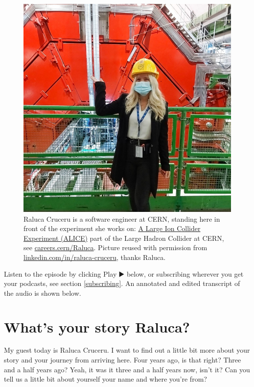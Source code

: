 \documentclass[
]{book}
\begin{document}
\begin{figure}

{\centering \includegraphics[width=1\linewidth]{images/raluca} 

}

\caption{Raluca Cruceru is a software engineer at CERN, standing here in front of the experiment she works on: \href{https://en.wikipedia.org/wiki/ALICE_experiment}{A Large Ion Collider Experiment (ALICE)} part of the Large Hadron Collider at CERN, see \href{https://careers.cern/Raluca}{careers.cern/Raluca}. Picture reused with permission from \href{https://www.linkedin.com/in/raluca-cruceru/}{linkedin.com/in/raluca-cruceru}, thanks Raluca.}\label{fig:raluca-fig}
\end{figure}



Listen to the episode by clicking Play ▶️ below, or subscribing wherever you get your podcasts, see section \ref{subscribing}. An annotated and edited transcript of the audio is shown below.

\hypertarget{ralucastory}{%
\section{What's your story Raluca?}\label{ralucastory}}

My guest today is Raluca Cruceru. I want to find out a little bit more about your story and your journey from arriving here. Four years ago, is that right? Three and a half years ago? Yeah, it was it three and a half years now, isn't it? Can you tell us a little bit about yourself your name and where you're from?
\end{document}
